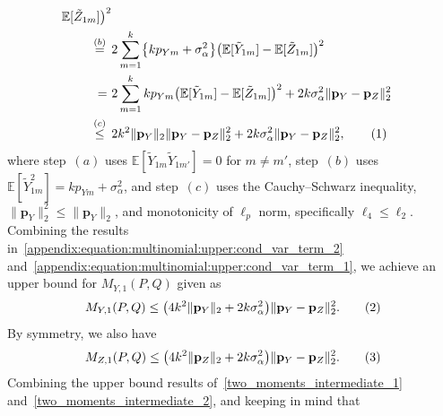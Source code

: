 \documentclass[twoside,11pt]{article}
\newcommand\numberthis{\addtocounter{equation}{1}\tag{\theequation}}
\newcommand{\rvTwo}{Y}
\newcommand{\rvThree}{Z}
\newcommand{\mE}{\mathbb{E}} %
\newcommand{\alphabetSize}{k} %
\newcommand{\vectorIndex}{m}
\newcommand{\probVecElement}[2]{p_{{#1}{#2}}}
\newcommand{\probVec}{\mathbf{p}} %
\newcommand{\kernelMoment}{M} %
\newcommand{\dataGenDist}{P}  %
\newcommand{\privacyMechanism}{Q}
\newcommand{\privacyParameter}{\alpha} %
\newcommand{\LapUParam}{\sigma_{\privacyParameter}}
\newcommand{\momentTwosampleVarCondexpY}{\kernelMoment_{\rvTwo,1}(\dataGenDist, \privacyMechanism)}
\newcommand{\momentTwosampleVarCondexpZ}{\kernelMoment_{\rvThree,1}(\dataGenDist, \privacyMechanism)}
\begin{document}
\begin{appendix}
\begin{align*}
		\mE [ \tilde{\rvThree}_{1 \vectorIndex}]
		\bigr)^2 
		\\ \stackrel{(b)}{=} \hskip 1.57mm &
		2\sum_{\vectorIndex=1}^\alphabetSize
		\bigl\{ \alphabetSize \probVecElement{\rvTwo}{\vectorIndex} + \LapUParam^2 \bigr\}
		\bigl(
		\mE [ \tilde{\rvTwo}_{1 \vectorIndex}]
		-
		\mE [ \tilde{\rvThree}_{1 \vectorIndex}]
		\bigr)^2
		\\ =~&
		2\sum_{\vectorIndex=1}^\alphabetSize
		\alphabetSize \probVecElement{\rvTwo}{\vectorIndex}
		\bigl(
		\mE [ \tilde{\rvTwo}_{1 \vectorIndex}]
		-
		\mE [ \tilde{\rvThree}_{1 \vectorIndex}]
		\bigr)^2
		+ 
		2 \alphabetSize \LapUParam^2
		\|\probVec_\rvTwo - \probVec_\rvThree\|_2^2
		\\\stackrel{(c)}{\leq}\hskip 1.57mm &
		2
		\alphabetSize^2 \|\probVec_\rvTwo\|_2
		\|\probVec_\rvTwo - \probVec_\rvThree\|_2^2
		+ 
		2 \alphabetSize \LapUParam^2
		\|\probVec_\rvTwo - \probVec_\rvThree\|_2^2,
		\numberthis \label{appendix:equation:multinomial:upper:cond_var_term_1}
	\end{align*}
	where step~$(a)$ uses $\mE[ \tilde{\rvTwo}_{1 \vectorIndex}  \tilde{\rvTwo}_{1 \vectorIndex'}] = 0$ for $m \neq m'$, 
	step~$(b)$ uses 
	$
	\mE[ \tilde{\rvTwo}_{1 \vectorIndex}^2] =\alphabetSize \probVecElement{\rvTwo}{\vectorIndex} +  \LapUParam^2$,
	and step~$(c)$ uses 
	the Cauchy--Schwarz inequality, 
	$\|\probVec_\rvTwo\|_2^2 \leq \|\probVec_\rvTwo\|_2$,
	and monotonicity of $\ell_p$ norm, specifically $\ell_4 \leq \ell_2$.
	Combining the results in~\eqref{appendix:equation:multinomial:upper:cond_var_term_2} and~\eqref{appendix:equation:multinomial:upper:cond_var_term_1}, we achieve an upper bound for $\momentTwosampleVarCondexpY $ given as 
	\begin{align*}
		\momentTwosampleVarCondexpY 
		\leq
		\bigl(
		4 \alphabetSize^2 \|\probVec_\rvTwo\|_2 
		+
		2 \alphabetSize \LapUParam^2
		\bigr)
		\|\probVec_\rvTwo - \probVec_\rvThree\|_2^2.
		\numberthis \label{two_moments_intermediate_1}
	\end{align*}
	By symmetry, we also have
	\begin{align*}
		\momentTwosampleVarCondexpZ
		\leq
		\bigl(
		4 \alphabetSize^2 \|\probVec_\rvThree\|_2 
		+
		2 \alphabetSize \LapUParam^2
		\bigr)
		\|\probVec_\rvTwo - \probVec_\rvThree\|_2^2.
		\numberthis \label{two_moments_intermediate_2}
	\end{align*}
	Combining the upper bound results of~\eqref{two_moments_intermediate_1} and~\eqref{two_moments_intermediate_2}, and keeping in mind that

\end{appendix}
\end{document}

